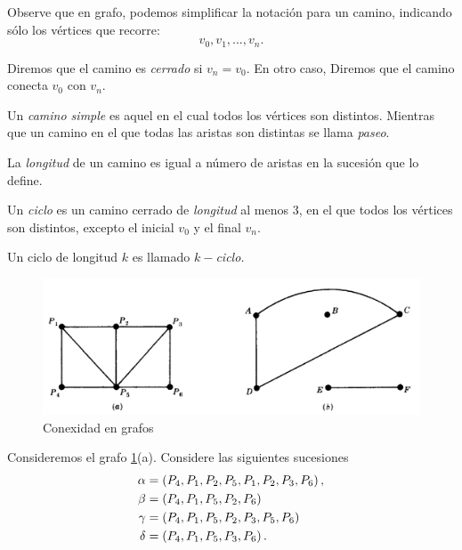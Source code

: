 	\begin{observacion}
		Observe que en grafo, podemos simplificar la notación para un camino, indicando sólo los v\'ertices que recorre:
		$$v_{0}, v_{1},..., v_{n}.$$ 
	\end{observacion}



	Diremos que el camino es \emph{cerrado} si $v_{n}=v_{0}.$ En otro caso, Diremos que el camino conecta $v_{0}$ con $v_{n}.$
	 
	
	Un \emph{camino simple} es aquel en el cual todos los v\'ertices son distintos. Mientras que un camino en el que todas las aristas son distintas se llama \emph{paseo}.
	



	La \emph{longitud} de un camino es igual a número de aristas en la sucesión que lo define.
	 



	Un \emph{ciclo} es un camino cerrado de \emph{longitud} al menos 3, en el que todos los v\'ertices son distintos, excepto el inicial $v_{0}$ y el final $v_{n}.$
	
	
	Un ciclo de longitud $k$ es llamado \emph{$k-$ciclo.}



	\begin{figure}
		\centering
		\includegraphics[width=10 cm,keepaspectratio=true]{./md/grafo_8_8.png}
		\caption{Conexidad en grafos}
		\label{fig:md0504}
	\end{figure}



	\begin{problema}
		\label{lip:exmp:8.1}
		Consideremos el grafo \ref{fig:md0504}(a). Considere las siguientes sucesiones
		\begin{align*}
			\alpha&=\left( P_{4}, P_{1}, P_{2}, P_{5}, P_{1},P_{2}, P_{3}, P_{6}  \right), \\
			\beta&=\left( P_{4}, P_{1}, P_{5}, P_{2}, P_{6} \right) \\
			\gamma&= \left( P_{4}, P_{1}, P_{5}, P_{2}, P_{3}, P_{5}, P_{6} \right)\\
			\delta&=\left( P_{4}, P_{1}, P_{5}, P_{3}, P_{6} \right).
		\end{align*}
		
	\end{problema}
	



